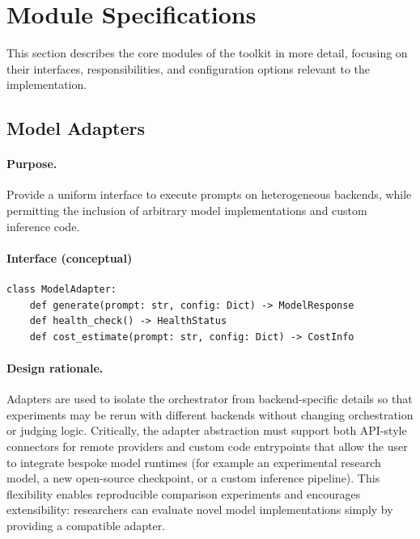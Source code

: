 \section{Module Specifications}\label{sec:module-specs}

This section describes the core modules of the toolkit in more detail, focusing on their interfaces, responsibilities, and configuration options relevant to the implementation.

\subsection{Model Adapters}\label{subsec:model-adapters}

\paragraph{Purpose.} Provide a uniform interface to execute prompts on heterogeneous backends, while permitting the inclusion of arbitrary model implementations and custom inference code.

\paragraph{Interface (conceptual)}
\begin{verbatim}
class ModelAdapter:
    def generate(prompt: str, config: Dict) -> ModelResponse
    def health_check() -> HealthStatus
    def cost_estimate(prompt: str, config: Dict) -> CostInfo
\end{verbatim}

\paragraph{Design rationale.}
Adapters are used to isolate the orchestrator from backend-specific details so that experiments may be rerun with different backends without changing orchestration or judging logic.
Critically, the adapter abstraction must support both API-style connectors for remote providers and custom code entrypoints that allow the user to integrate bespoke model runtimes (for example an experimental research model, a new open-source checkpoint, or a custom inference pipeline).
This flexibility enables reproducible comparison experiments and encourages extensibility: researchers can evaluate novel model implementations simply by providing a compatible adapter.

